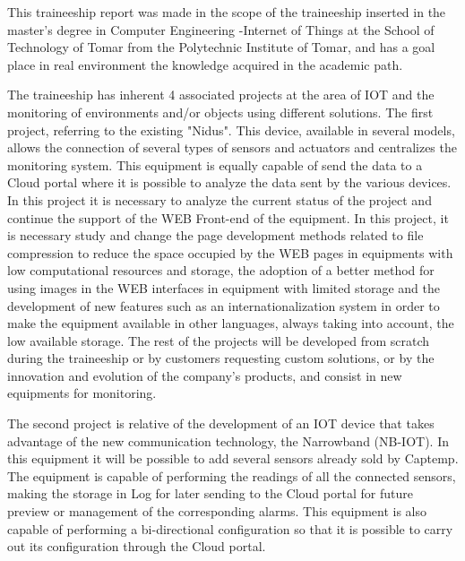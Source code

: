 
\vspace{1cm}
\noindent
\textbf{} 

\par This traineeship report was made in the scope of the traineeship inserted in the master's degree in Computer Engineering -Internet of Things at the School of Technology of Tomar from the Polytechnic Institute of Tomar, and has a goal place in real environment the knowledge acquired in the academic path.


\par The traineeship has inherent 4 associated projects at the area of IOT and the monitoring of environments and/or objects using different solutions. The first project, referring to the existing "Nidus". This device, available in several models, allows the connection of several types of sensors and actuators and centralizes the monitoring system. This equipment is equally capable of send the data to a Cloud portal where it is possible to analyze the data sent by the various devices. In this project it is necessary to analyze the current status of the project and continue the support of the WEB Front-end of the equipment. In this project, it is necessary study and change the page development methods related to file compression to reduce the space occupied by the WEB pages in equipments with low computational resources and storage, the adoption of a better method for using images in the WEB interfaces in equipment with limited storage and the development of new features such as an internationalization system in order to make the equipment available in other languages, always taking into account, the low available storage. The rest of the projects will be developed from scratch during the traineeship or by customers requesting custom solutions, or by the innovation and evolution of the company's products, and consist in new equipments for monitoring.


\par The second project is relative of the development of an IOT device that takes advantage of the new communication technology, the Narrowband (NB-IOT). In this equipment it will be possible to add several sensors already sold by Captemp. The equipment is capable of performing the readings of all the connected sensors, making the storage in Log for later sending to the Cloud portal for future preview or management of the corresponding alarms. This equipment is also capable of performing a bi-directional configuration so that it is possible to carry out its configuration through the Cloud portal.


